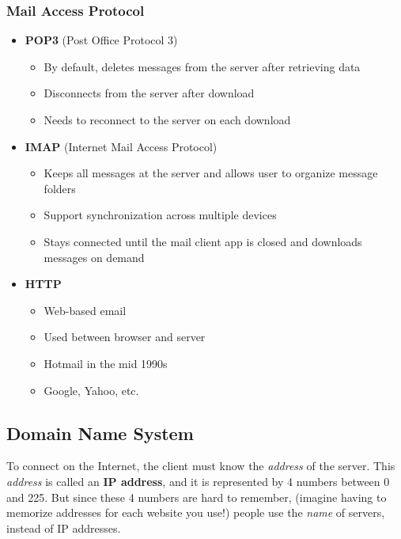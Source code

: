\subsubsection{Mail Access Protocol}
\begin{itemize}
	\item \textbf{POP3} (Post Office Protocol 3)
	\begin{itemize}
		\item By default, deletes messages from the server after retrieving data
		\item Disconnects from the server after download 
		\item Needs to reconnect to the server on each download
	\end{itemize}
	\item \textbf{IMAP} (Internet Mail Access Protocol)
	\begin{itemize}
		\item Keeps all messages at the server and allows user to organize message folders
		\item Support synchronization across multiple devices
		\item Stays connected until the mail client app is closed and downloads messages on demand
	\end{itemize}
	\item \textbf{HTTP}
	\begin{itemize}
		\item Web-based email
		\item Used between browser and server
		\item Hotmail in the mid 1990s
		\item Google, Yahoo, etc.
	\end{itemize}
\end{itemize}

\subsection{Domain Name System}
To connect on the Internet, the client must know the \textit{address} of the server. This \textit{address} is called an \textbf{IP address}, and it is represented by 4 numbers between 0 and 225. But since these 4 numbers are hard to remember, (imagine having to memorize addresses for each website you use!) people use the \textit{name} of servers, instead of IP addresses.

